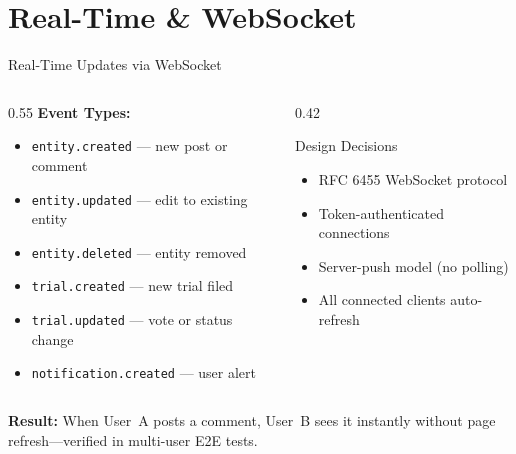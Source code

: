 \documentclass[aspectratio=169,11pt]{beamer}
\begin{document}
\section{Real-Time \& WebSocket}

\begin{frame}{Real-Time Updates via WebSocket}
  \begin{columns}[T]
    \begin{column}{0.55\textwidth}
      \textbf{Event Types:}
      \begin{itemize}
        \item \texttt{entity.created} --- new post or comment
        \item \texttt{entity.updated} --- edit to existing entity
        \item \texttt{entity.deleted} --- entity removed
        \item \texttt{trial.created} --- new trial filed
        \item \texttt{trial.updated} --- vote or status change
        \item \texttt{notification.created} --- user alert
      \end{itemize}
    \end{column}
    \begin{column}{0.42\textwidth}
      \begin{block}{Design Decisions}
        \begin{itemize}
          \item RFC 6455 WebSocket protocol
          \item Token-authenticated connections
          \item Server-push model (no polling)
          \item All connected clients auto-refresh
        \end{itemize}
      \end{block}
    \end{column}
  \end{columns}
  \vspace{0.5em}
  \textbf{Result:} When User~A posts a comment, User~B sees it
  instantly without page refresh---verified in multi-user E2E tests.
\end{frame}
\end{document}

